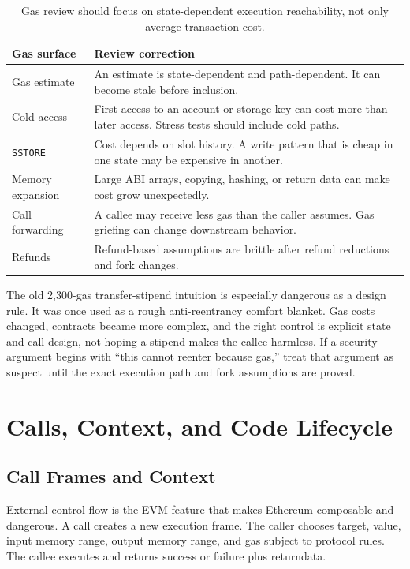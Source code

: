 \begin{table}[htbp]
\centering
\small
\renewcommand{\arraystretch}{1.18}
\begin{tabularx}{\textwidth}{@{}>{\RaggedRight\arraybackslash}p{}X@{}}
\toprule
Gas surface & Review correction \\
\midrule
Gas estimate & An estimate is state-dependent and path-dependent. It can become stale before inclusion. \\
Cold access & First access to an account or storage key can cost more than later access. Stress tests should include cold paths. \\
\texttt{SSTORE} & Cost depends on slot history. A write pattern that is cheap in one state may be expensive in another. \\
Memory expansion & Large ABI arrays, copying, hashing, or return data can make cost grow unexpectedly. \\
Call forwarding & A callee may receive less gas than the caller assumes. Gas griefing can change downstream behavior. \\
Refunds & Refund-based assumptions are brittle after refund reductions and fork changes. \\
\bottomrule
\end{tabularx}
\caption{Gas review should focus on state-dependent execution reachability, not only average transaction cost.}
\end{table}

The old 2,300-gas transfer-stipend intuition is especially dangerous as a design rule. It was once used as a rough anti-reentrancy comfort blanket. Gas costs changed, contracts became more complex, and the right control is explicit state and call design, not hoping a stipend makes the callee harmless. If a security argument begins with ``this cannot reenter because gas,'' treat that argument as suspect until the exact execution path and fork assumptions are proved.

\section{Calls, Context, and Code Lifecycle}

\subsection{Call Frames and Context}

External control flow is the EVM feature that makes Ethereum composable and dangerous. A call creates a new execution frame. The caller chooses target, value, input memory range, output memory range, and gas subject to protocol rules. The callee executes and returns success or failure plus returndata.

